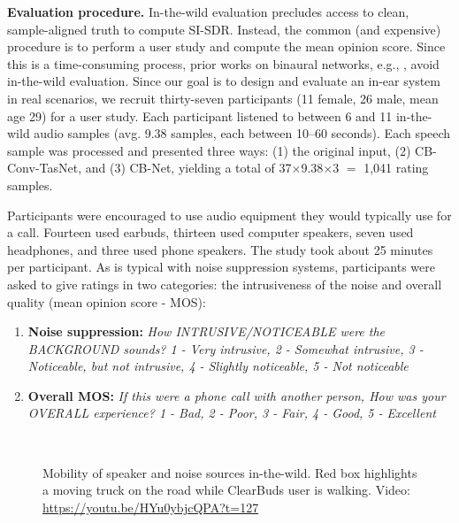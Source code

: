 \documentclass [11pt, proquest] {uwthesis}[2020/02/24]
\begin{document}
{\bf Evaluation procedure.} In-the-wild evaluation precludes access to clean, sample-aligned truth to compute SI-SDR. Instead, the common (and expensive)  procedure is to perform a user study and compute the mean opinion score. Since this is a time-consuming process, prior works on binaural networks, e.g.,  \cite{luo2020endtoend, binaural_osu, jenrungrot2020cone}, avoid in-the-wild evaluation.  Since our goal is to design and evaluate an in-ear system in real scenarios, we recruit thirty-seven participants (11 female, 26 male, mean age 29)  for a user study. Each participant listened to between 6 and 11 in-the-wild audio samples (avg. 9.38 samples, each between 10--60 seconds). Each speech sample was processed and presented three ways: (1) the original input, (2) CB-Conv-TasNet, and (3) CB-Net, yielding a total of 37$\times$9.38$\times$3 $=$ 1,041 rating samples.

Participants were encouraged to use audio equipment they would typically use for a call. Fourteen used earbuds, thirteen used computer speakers, seven used headphones, and three used phone speakers. The study took about 25 minutes per participant. As is typical with noise suppression systems, participants were asked to give ratings in two categories: the intrusiveness of the noise and overall quality (mean opinion score - MOS):

\begin{small}
\begin{enumerate}
    \item \textbf{Noise suppression: }\textit{How INTRUSIVE/NOTICEABLE were the BACKGROUND sounds? 1 - Very intrusive, 2 - Somewhat intrusive, 3 - Noticeable, but not intrusive, 4 - Slightly noticeable, 5 - Not noticeable}
    \item \textbf{Overall MOS: }\textit{If this were a phone call with another person, How was your OVERALL experience? 1 - Bad, 2 - Poor, 3 - Fair, 4 - Good, 5 - Excellent}  
\end{enumerate}
\end{small}

\begin{figure}
\centering  
{} %
{}\\
\vskip -0.15in
\caption{Mobility of speaker and noise sources in-the-wild. Red box highlights a moving truck on the road while ClearBuds user is walking.  Video: \linebreak \textcolor{blue}{\url{https://youtu.be/HYu0ybjcQPA?t=127}}}
\label{fig:mobility}
\vskip -0.2in
\end{figure}
\end{document}
